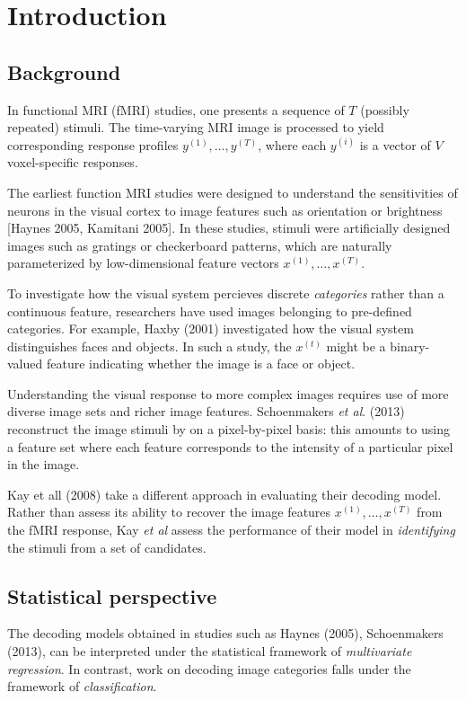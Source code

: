 \documentclass[11pt]{article}
\begin{document}
\section{Introduction}

\subsection{Background}

In functional MRI (fMRI) studies, one presents a sequence of $T$
(possibly repeated) stimuli.  The time-varying MRI image is processed
to yield corresponding response profiles $y^{(1)}, \hdots, y^{(T)}$,
where each $y^{(i)}$ is a vector of $V$ voxel-specific responses.

The earliest function MRI studies were designed to understand the
sensitivities of neurons in the visual cortex to image features such
as orientation or brightness [Haynes 2005, Kamitani 2005].  In these
studies, stimuli were artificially designed images such as gratings or
checkerboard patterns, which are naturally parameterized by
low-dimensional feature vectors $x^{(1)}, \hdots, x^{(T)}$.

To investigate how the visual system percieves discrete
\emph{categories} rather than a continuous feature, researchers have
used images belonging to pre-defined categories.  For example, Haxby
(2001) investigated how the visual system distinguishes faces and
objects.  In such a study, the $x^{(t)}$ might be a binary-valued
feature indicating whether the image is a face or object.

Understanding the visual response to more complex images requires use
of more diverse image sets and richer image features.  Schoenmakers
\emph{et al}. (2013) reconstruct the image stimuli by on a
pixel-by-pixel basis: this amounts to using a feature set where each
feature corresponds to the intensity of a particular pixel in the
image.

Kay et all (2008) take a different approach in evaluating their
decoding model.  Rather than assess its ability to recover the image
features $x^{(1)}, \hdots, x^{(T)}$ from the fMRI response, Kay
\emph{et al} assess the performance of their model in
\emph{identifying} the stimuli from a set of candidates.

\subsection{Statistical perspective}

The decoding models obtained in studies such as Haynes (2005),
Schoenmakers (2013), can be interpreted under the statistical
framework of \emph{multivariate regression}.  In contrast, work on
decoding image categories falls under the framework of
\emph{classification}.
\end{document}
